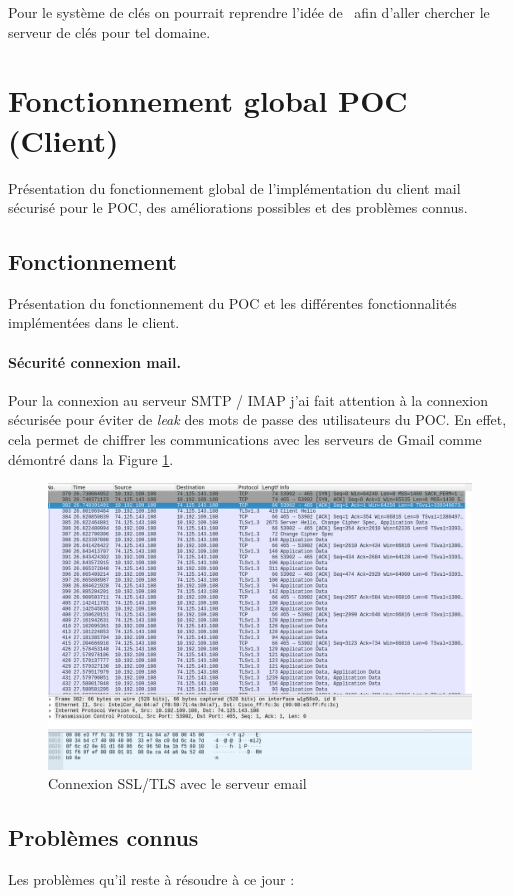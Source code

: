 Pour le système de clés on pourrait reprendre l'idée de~\cite{journals/ijnsec/BalakrishnanR16} afin d'aller chercher le serveur de clés pour tel domaine.
\section{Fonctionnement global POC (Client)}
Présentation du fonctionnement global de l'implémentation du client mail sécurisé pour le POC, des améliorations possibles et des problèmes connus.
\subsection{Fonctionnement}
Présentation du fonctionnement du POC et les différentes fonctionnalités implémentées dans le client.
\paragraph*{Sécurité connexion mail.}
Pour la connexion au serveur SMTP / IMAP j'ai fait attention à la connexion sécurisée pour éviter de \textit{leak} des mots de passe des utilisateurs du POC. En effet, cela permet de chiffrer les communications avec les serveurs de Gmail comme démontré dans la Figure \ref{fig:securityProofEmail}.
\begin{figure}[h!]
	\centering
	\includegraphics[width=14cm]{images/packetProofEncrypted.png}
	\caption{Connexion SSL/TLS avec le serveur email}
	\label{fig:securityProofEmail}
\end{figure}
\subsection{Problèmes connus}
Les problèmes qu'il reste à résoudre à ce jour :
